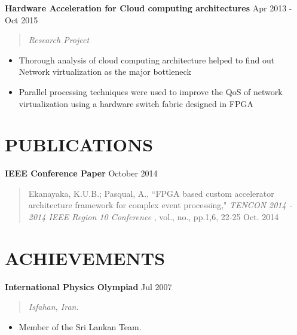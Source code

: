 \documentclass[mm]{res} %
\begin{document}
\begin{resume}
\textbf{Hardware Acceleration for Cloud computing architectures} \hfill Apr 2013 - Oct 2015
\begin{quote}
\emph{Research Project}
\end{quote}

\begin{itemize} \itemsep -1pt %
\item Thorough analysis of cloud computing architecture helped to find out Network virtualization as the major bottleneck
\item Parallel processing techniques were used to improve the QoS of network virtualization using a hardware switch fabric designed in FPGA
\end{itemize}

\vspace {2 mm}
\section{PUBLICATIONS} 

\textbf{IEEE Conference Paper } \hfill October 2014
\begin{quote}
Ekanayaka, K.U.B.; Pasqual, A., ``FPGA based custom accelerator architecture framework for complex event processing," \emph{TENCON 2014 - 2014 IEEE Region 10 Conference} , vol., no., pp.1,6, 22-25 Oct. 2014
\end{quote}
 

\section{ACHIEVEMENTS} 

\textbf{International Physics Olympiad} \hfill Jul 2007
\begin{quote}
\emph{Isfahan, Iran.}
\end{quote}

\begin{itemize} \itemsep -1pt %
\item Member of the Sri Lankan Team.
\end{itemize}


\end{resume}
\end{document}
